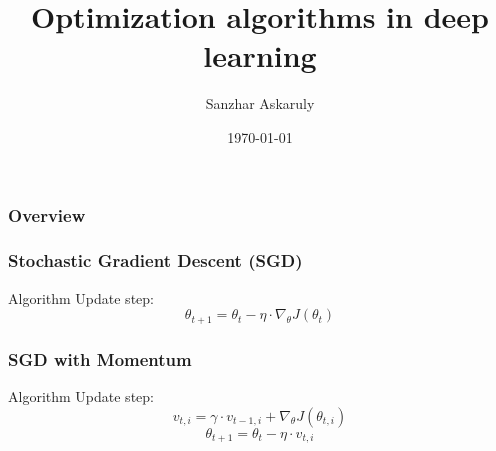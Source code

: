 \documentclass{beamer}
\title[CodeSeoul] %
	{Optimization algorithms in deep learning}
\author[AI Research Paper Review] %
	{Sanzhar Askaruly}
\institute[] %
	{ Ulsan National Institute of Science and Technology\newline
	  Ph.D. Candidate in Biomedical Engineering}
\date{\today}
\begin{document}

    \begin{frame}
    \frametitle{Overview} %
    \tableofcontents 
    \end{frame}

    \begin{frame}
      \frametitle{Stochastic Gradient Descent (SGD)} %
      \begin{block}{Algorithm}
        Update step:
        \begin{equation}    %
          \theta_{t+1} = \theta_{t} - \eta \cdot \nabla_{\theta}J(\theta_t)
        \end{equation}
      \end{block}
    \end{frame}

    \begin{frame}
      \frametitle{SGD with Momentum} %
      \begin{block}{Algorithm}
        Update step:
        \begin{equation}    %
          v_{t,i} = \gamma \cdot v_{t-1,i} + \nabla_{\theta}J(\theta_{t,i})
        \end{equation}
        \begin{equation}    %
          \theta_{t+1} = \theta_{t} - \eta \cdot v_{t,i}
        \end{equation}
      \end{block}
    \end{frame}
\end{document}
